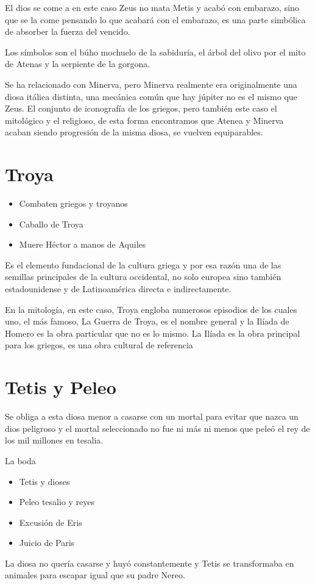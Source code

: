 El dios se come a en este caso Zeus no mata Metis y acabó con embarazo, sino que se la come pensando lo que acabará con el embarazo, es una parte simbólica de absorber la fuerza del vencido.

Los símbolos son el búho mochuelo de la sabiduría, el árbol del olivo por el mito de Atenas y la serpiente de la gorgona.

Se ha relacionado con Minerva, pero Minerva realmente era originalmente una diosa itálica distinta, una mecánica común que hay júpiter no es el mismo que Zeus. El conjunto de iconografía de los griegos, pero también este caso el mitológico y el religioso, de esta forma encontramos que Atenea y Minerva acaban siendo progresión de la misma diosa, se vuelven equiparables.

\section{Troya}
\begin{itemize}
	\item Combaten griegos y troyanos
	\item Caballo de Troya
	\item Muere Héctor a manos de Aquiles
\end{itemize}

Es el elemento fundacional de la cultura griega y por esa razón una de las semillas principales de la cultura occidental, no solo europea sino también estadounidense y de Latinoamérica directa e indirectamente.

En la mitología, en este caso, Troya engloba numerosos episodios de los cuales uno, el más famoso, La Guerra de Troya, es el nombre general y la Ilíada de Homero es la obra particular que no es lo mismo. La Ilíada es la obra principal para los griegos, es una obra cultural de referencia

\section{Tetis y Peleo}
Se obliga a esta diosa menor a casarse con un mortal para evitar que nazca un dios peligroso y el mortal seleccionado no fue ni más ni menos que peleó el rey de los mil millones en tesalia.

La boda
\begin{itemize}
	\item Tetis y dioses
	\item Peleo tesalio y reyes
	\item Excusión de Eris
	\item Juicio de Paris
\end{itemize}
La diosa no quería casarse y huyó constantemente y Tetis se transformaba en animales para escapar igual que su padre Nereo.


